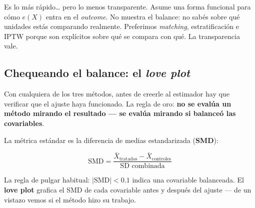 \documentclass[
  letterpaper,
  DIV=11,
  numbers=noendperiod,
  oneside]{scrreprt}
\begin{document}
Es lo más rápido\ldots{} pero lo menos transparente. Asume una forma
funcional para cómo \(e(X)\) entra en el \emph{outcome}. No muestra el
balance: no sabés sobre qué unidades estás comparando realmente.
Preferimos \emph{matching}, estratificación e IPTW porque son explícitos
sobre qué se compara con qué. La transparencia vale.

\hypertarget{chequeando-el-balance-el-love-plot}{%
\subsection{\texorpdfstring{Chequeando el balance: el \emph{love
plot}}{Chequeando el balance: el love plot}}\label{chequeando-el-balance-el-love-plot}}

Con cualquiera de los tres métodos, antes de creerle al estimador hay
que verificar que el ajuste haya funcionado. La regla de oro: \textbf{no
se evalúa un método mirando el resultado --- se evalúa mirando si
balanceó las covariables}.

La métrica estándar es la diferencia de medias estandarizada
(\textbf{SMD}):

\[\text{SMD} = \frac{\bar{X}_{\text{tratados}} - \bar{X}_{\text{controles}}}{\text{SD combinada}}\]

La regla de pulgar habitual: \(|\text{SMD}| < 0.1\) indica una
covariable balanceada. El \textbf{love plot} grafica el SMD de cada
covariable antes y después del ajuste --- de un vistazo vemos si el
método hizo su trabajo.
\end{document}
